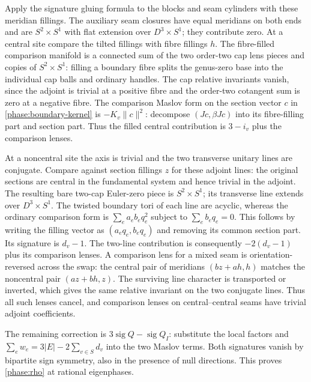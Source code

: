 Apply the signature gluing formula \cite[Theorem 3.9]{Toffoli} to the blocks and seam cylinders with these meridian fillings. The auxiliary seam closures have equal meridians on both ends and are \(S^2\times S^1\) with flat extension over \(D^3\times S^1\); they contribute zero. At a central site compare the tilted fillings with fibre fillings \(h\). The fibre-filled comparison manifold is a connected sum of the two order-two cap lens pieces and copies of \(S^2\times S^1\): filling a boundary fibre splits the genus-zero base into the individual cap balls and ordinary handles. The cap relative invariants vanish, since the adjoint is trivial at a positive fibre and the order-two cotangent sum is zero at a negative fibre. The comparison Maslov form on the section vector \(c\) in \eqref{phase:boundary-kernel} is \(-K_v\lVert c\rVert^2\): decompose \((Jc,\beta Jc)\) into its fibre-filling part and section part. Thus the filled central contribution is \(3-i_v\) plus the comparison lenses.

At a noncentral site the axis is trivial and the two transverse unitary lines are conjugate. Compare against section fillings \(z\) for these adjoint lines: the original sections are central in the fundamental system and hence trivial in the adjoint. The resulting bare two-cap Euler-zero piece is \(S^2\times S^1\); its transverse line extends over \(D^3\times S^1\). The twisted boundary tori of each line are acyclic, whereas the ordinary comparison form is
\(\sum_e a_e b_e q_e^2\) subject to \(\sum_e b_e q_e=0\). This follows by writing the filling vector as \((a_e q_e,b_e q_e)\) and removing its common section part. Its signature is \(d_v-1\). The two-line contribution is consequently \(-2(d_v-1)\) plus its comparison lenses. A comparison lens for a mixed seam is orientation-reversed across the swap: the central pair of meridians \((b z+a h,h)\) matches the noncentral pair \((a z+b h,z)\). The surviving line character is transported or inverted, which gives the same relative invariant on the two conjugate lines. Thus all such lenses cancel, and comparison lenses on central--central seams have trivial adjoint coefficients.

The remaining correction is \(3\operatorname{sig}Q-\operatorname{sig}Q_I\): substitute the local factors and \(\sum_e w_e=3|E|-2\sum_{v\in S}d_v\) into the two Maslov terms. Both signatures vanish by bipartite sign symmetry, also in the presence of null directions. This proves \eqref{phase:rho} at rational eigenphases.

